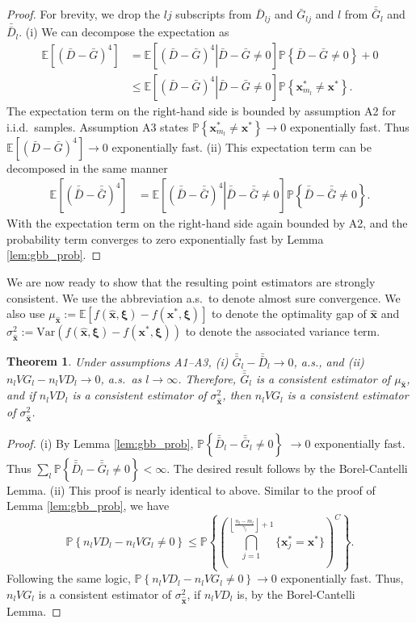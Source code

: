 \documentclass[12pt]{article}
\newtheorem{theorem}{Theorem}
\newcommand{\p}[1]{\mathbb{P} \left\{ #1 \right\}}
\newcommand{\e}[1]{\mathbb{E} \left[ #1 \right]
}
\newcommand{\var}[1]{\mathrm{Var} \left( #1 \right)}
\newcommand{\x}{\mathbf{x}}
\newcommand{\xh}{{\hat{\x}}}
\newcommand{\xs}{\x^*}
\newcommand{\xit}{\boldsymbol{\xi}}
\newcommand{\nbl}{\left\lfloor\tfrac{n_l-m_l}{\gamma_l}\right\rfloor+1}
\newcommand{\gb}{\bar{G}}
\newcommand{\gbb}{\bar{\gb}}
\newcommand{\db}{\bar{D}}
\newcommand{\dbb}{\bar{\db}}
\begin{document}
\begin{proof}
	For brevity, we drop the $lj$ subscripts from $\db_{lj}$ and $\gb_{lj}$ and $l$ from $\gbb_l$ and $\dbb_l$.
	(i) We can decompose the expectation as
	\begin{align*}
		\e{(\db - \gb)^4} & = \e{ \left.(\db - \gb)^4 \right| \db - \gb \neq 0} \p{\db - \gb \neq 0} + 0\\
		& \leq \e{ \left.(\db - \gb)^4 \right| \db - \gb \neq 0} \p{ \xs_{m_l}  \neq \xs}.
	\end{align*}
	The expectation term on the right-hand side is bounded by assumption A2 for i.i.d.\ samples.  
        Assumption A3 states $\p{\xs_{m_l} \neq \xs} \rightarrow 0$ exponentially fast.  
        Thus $\e{(\db - \gb)^4} \rightarrow 0$ exponentially fast.
(ii) This expectation term can be decomposed in the same manner
	\begin{align*}
		\e{(\dbb - \gbb)^4} & = \e{\left. (\dbb - \gbb)^4 \right| \dbb - \gbb \neq 0} \p{\dbb - \gbb \neq 0}.
	\end{align*}
	With the expectation term on the right-hand side again bounded by A2, and the probability term converges to zero exponentially fast by Lemma \ref{lem:gbb_prob}.
\end{proof}

We are now ready to show that the resulting point estimators are strongly consistent. 
We use the abbreviation a.s.\ to denote almost sure convergence. 
We also use $\mu_{\xh} := \e{f(\xh,\xit) - f(\xs,\xit)}$ to denote the optimality gap of $\xh$ and $\sigma^2_{\xh} := \var{f(\xh,\xit) - f(\xs,\xit)}$ to denote the associated variance term. 

\begin{theorem} \label{thm:strong_consistency}
	Under assumptions A1--A3, (i) $\gbb_l - \dbb_l \rightarrow 0$, a.s., and (ii) $n_l VG_l - n_l VD_l \rightarrow 0$, a.s.\ as $l \rightarrow \infty$.  
        Therefore, $\gbb_l$ is a consistent estimator of $\mu_{\xh}$, and if $n_l VD_l$ is a consistent estimator of $\sigma^2_{\xh}$, then $n_l VG_l$ is a consistent estimator of $\sigma^2_{\xh}$.
\end{theorem}

\begin{proof}
	(i) By Lemma \ref{lem:gbb_prob}, $\p{\dbb_l - \gbb_l \neq 0}$ $\rightarrow 0$ exponentially fast.  
        Thus $\sum_l \p{\dbb_l - \gbb_l \neq 0} < \infty$.  
        The desired result follows by the Borel-Cantelli Lemma.
%
(ii) This proof is nearly identical to above. 
Similar to the proof of Lemma \ref{lem:gbb_prob}, we have
	\[
		\p{n_l VD_l -n_l VG_l \neq 0} \leq \p{\left( \bigcap_{j=1}^{\nbl} \{\xs_{j} = \xs\} \right)^C}.
	\]
	Following the same logic, $\p{n_l VD_l -n_l VG_l \neq 0} \rightarrow 0$ exponentially fast. 
Thus, $n_l VG_l$ is a consistent estimator of $\sigma^2_{\xh}$, if $n_l VD_l$ is, by the Borel-Cantelli Lemma.
\end{proof}
\end{document}
